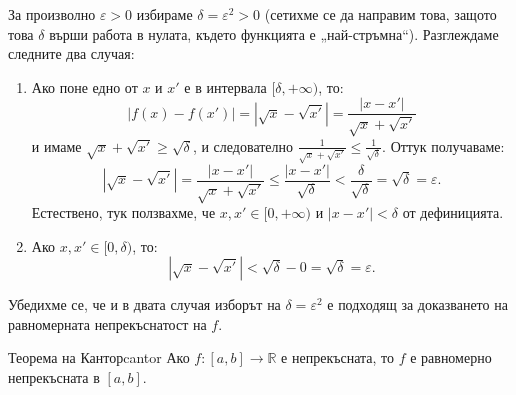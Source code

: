 За произволно $\varepsilon > 0$ избираме $\delta = \varepsilon^2 > 0$ (сетихме се да направим това, защото това $\delta$ върши работа в нулата, където функцията е „най-стръмна“). Разглеждаме следните два случая:
\begin{enumerate}
    \item Ако поне едно от $x$ и $x'$ е в интервала $[\delta, +\infty)$, то:
    \[
    |f(x) - f(x')| = |\sqrt{x} - \sqrt{x'}| = \frac{|x - x'|}{\sqrt{x} + \sqrt{x'}}
    \]
    и имаме $\sqrt{x} + \sqrt{x'} \ge \sqrt{\delta}$, и следователно $\frac{1}{\sqrt{x} + \sqrt{x'}} \le \frac{1}{\sqrt{\delta}}$. Оттук получаваме:
    \[
    |\sqrt{x} - \sqrt{x'}| = \frac{|x - x'|}{\sqrt{x} + \sqrt{x'}} \le \frac{|x - x'|}{\sqrt{\delta}} < \frac{\delta}{\sqrt{\delta}} = \sqrt{\delta} = \varepsilon.
    \]
    Естествено, тук ползвахме, че $x, x' \in [0, +\infty)$ и $|x - x'| < \delta$ от дефиницията.
    \item Ако $x, x' \in [0, \delta)$, то:
    \[
    |\sqrt{x} - \sqrt{x'}| < \sqrt{\delta} - 0 = \sqrt{\delta} = \varepsilon.
    \]
\end{enumerate}
Убедихме се, че и в двата случая изборът на $\delta = \varepsilon^2$ е подходящ за доказването на равномерната непрекъснатост на $f$.

\begin{theorem}{Теорема на Кантор}{cantor}
Ако $f : [a, b] \to \mathbb{R}$ е непрекъсната, то $f$ е равномерно непрекъсната в $[a, b]$.
\end{theorem}


